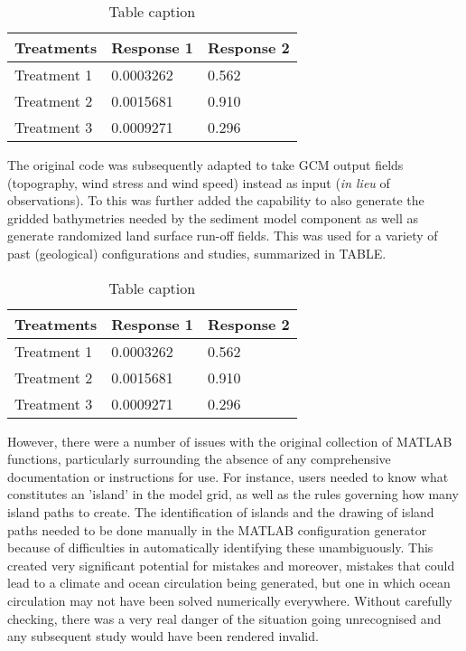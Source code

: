 \documentclass[11pt,fleqn]{book} %
\begin{document}
\begin{table}[h]
\centering
\begin{tabular}{l l l}
\toprule
\textbf{Treatments} & \textbf{Response 1} & \textbf{Response 2}\\
\midrule
Treatment 1 & 0.0003262 & 0.562 \\
Treatment 2 & 0.0015681 & 0.910 \\
Treatment 3 & 0.0009271 & 0.296 \\
\bottomrule
\end{tabular}
\caption{Table caption}
\end{table}

The original code was subsequently adapted to take GCM output fields (topography, wind stress and wind speed) instead as input (\textit{in lieu} of observations). To this was further added the capability to also generate the gridded bathymetries needed by the sediment model component as well as generate randomized land surface run-off fields. This was used for a variety of past (geological) configurations and studies, summarized in TABLE.

\begin{table}[h]
\centering
\begin{tabular}{l l l}
\toprule
\textbf{Treatments} & \textbf{Response 1} & \textbf{Response 2}\\
\midrule
Treatment 1 & 0.0003262 & 0.562 \\
Treatment 2 & 0.0015681 & 0.910 \\
Treatment 3 & 0.0009271 & 0.296 \\
\bottomrule
\end{tabular}
\caption{Table caption}
\end{table}

However, there were a number of issues with the original collection of MATLAB functions, particularly surrounding the absence of any comprehensive documentation or instructions for use. For instance, users needed to know what constitutes an 'island' in the model grid, as well as the rules governing how many island paths to create. The identification of islands and the drawing of island paths needed to be done manually in the MATLAB configuration generator because of difficulties in automatically identifying these unambiguously. This created very significant potential for mistakes and moreover, mistakes that could lead to a climate and ocean circulation being generated, but one in which ocean circulation may not have been solved numerically everywhere. Without carefully checking, there was a very real danger of the situation going unrecognised and any subsequent study would have been rendered invalid.
\end{document}
